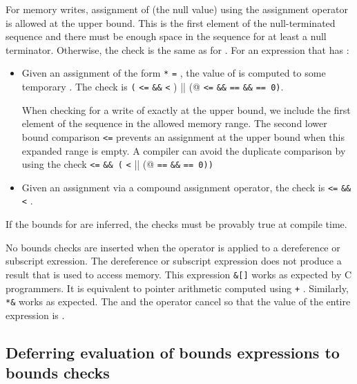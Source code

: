 For memory writes, assignment of  (the null value)
using the assignment operator is allowed at the upper bound.
This is the first element of the null-terminated sequence
and there must be enough space in the sequence for at least a null terminator.
Otherwise, the check
is the same as for \arrayptr.   For an expression {} that
has {}:
\begin{itemize}
\item Given an assignment of the form \lstinline|*| \lstinline|=| , the
value of  is computed to some temporary .  The
check is \lstinline|(| \lstinline|<=|  \lstinline|&&|  \lstinline|<|
\lstinline@) || (@  \lstinline|<=|  \lstinline|&&| 
\lstinline|==|  \lstinline|&&|  \lstinline|== 0)|.

When checking for a write of  exactly at the upper bound, we
include the first element of the sequence in the allowed memory range.
The second lower bound comparison  \lstinline|<=| 
prevents an assignment
at the upper bound when this expanded range is empty.
A compiler can avoid the duplicate comparison by using
the check
 \lstinline|<=|  \lstinline|&& (| \lstinline|<| 
\lstinline@|| (@ \lstinline|==|  \lstinline|&&|  \lstinline|== 0))|
\item Given an assignment via a compound assignment operator, the check
is  \lstinline|<=|  \lstinline|&&|  \lstinline|<| .
\end{itemize}

If the bounds for  are inferred, the checks
must be provably true at compile time.

No bounds checks are inserted when the \code{&} operator is applied to
a dereference or subscript exression.
The dereference or subscript expression does not produce a result that is used
to access memory.  This expression \lstinline|&|\lstinline|[|\lstinline|]|
works as expected by C programmers.  It is equivalent to pointer arithmetic computed using
 \lstinline|+| .   Similarly, \lstinline|*&| works
as expected.  The \code{&} and the \code{*} operator cancel so that
the value of the entire expression is .

\subsection{Deferring evaluation of bounds expressions to bounds checks}

